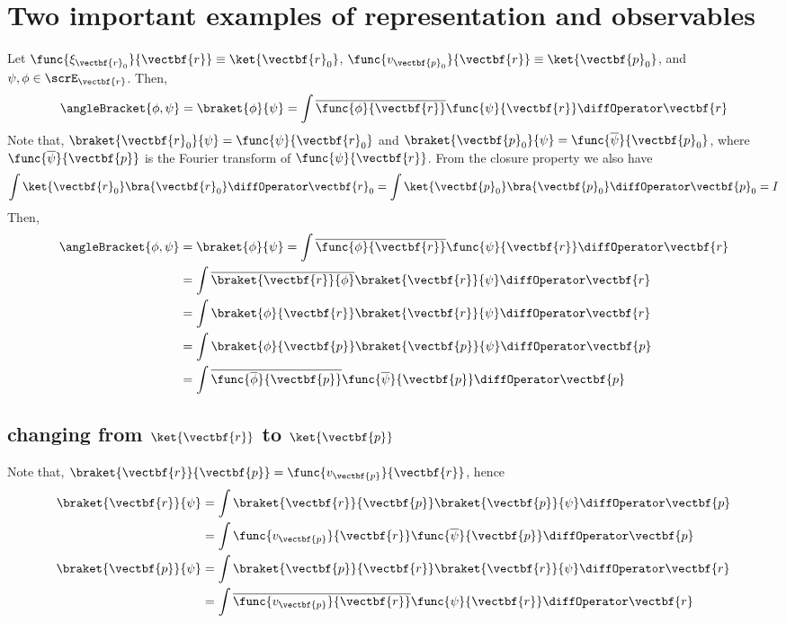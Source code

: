 \section{Two important examples of representation and observables}
Let \(\func{\xi_{\vectbf{r}_0}}{\vectbf{r}} \equiv \ket{\vectbf{r}_0}\), \(\func{v_{\vectbf{p}_0}}{\vectbf{r}} \equiv \ket{\vectbf{p}_0}\), and \(\psi, \phi \in \scrE_{\vectbf{r}}\). Then,
\begin{equation*}
    \angleBracket{\phi,\psi} = \braket{\phi}{\psi} = \int \overline{\func{\phi}{\vectbf{r}}} \func{\psi}{\vectbf{r}} \diffOperator \vectbf{r}
\end{equation*}
Note that, \(\braket{\vectbf{r}_0}{\psi} = \func{\psi}{\vectbf{r}_0}\) and \(\braket{\vectbf{p}_0}{\psi} = \func{\overline{\psi}}{\vectbf{p}_0}\), where \(\func{\overline{\psi}}{\vectbf{p}}\) is the Fourier transform of \(\func{\psi}{\vectbf{r}}\). From the closure property we also have
\begin{equation*}
    \int \ket{\vectbf{r}_0} \bra{\vectbf{r}_0} \diffOperator \vectbf{r}_0 = \int \ket{\vectbf{p}_0} \bra{\vectbf{p}_0} \diffOperator \vectbf{p}_0 = I
\end{equation*}
Then,
\begin{align*}
    \angleBracket{\phi,\psi} & = \braket{\phi}{\psi} = \int \overline{\func{\phi}{\vectbf{r}}} \func{\psi}{\vectbf{r}} \diffOperator \vectbf{r} \\
                             & = \int \overline{\braket{\vectbf{r}}{\phi}} \braket{\vectbf{r}}{\psi} \diffOperator \vectbf{r}                   \\
                             & = \int \braket{\phi}{\vectbf{r}} \braket{\vectbf{r}}{\psi} \diffOperator \vectbf{r}                              \\
                             & = \int \braket{\phi}{\vectbf{p}} \braket{\vectbf{p}}{\psi} \diffOperator \vectbf{p}                              \\
                             & = \int \overline{\func{\overline{\phi}}{\vectbf{p}}} \func{\overline{\psi}}{\vectbf{p}} \diffOperator \vectbf{p}
\end{align*}
\subsection{changing from \(\ket{\vectbf{r}}\) to \(\ket{\vectbf{p}}\)}
Note that, \(\braket{\vectbf{r}}{\vectbf{p}} = \func{v_{\vectbf{p}}}{\vectbf{r}}\), hence
\begin{align*}
    \braket{\vectbf{r}}{\psi} & = \int \braket{\vectbf{r}}{\vectbf{p}} \braket{\vectbf{p}}{\psi} \diffOperator \vectbf{p}            \\
                              & = \int \func{v_{\vectbf{p}}}{\vectbf{r}} \func{\overline{\psi}}{\vectbf{p}} \diffOperator \vectbf{p} \\
    \braket{\vectbf{p}}{\psi} & = \int \braket{\vectbf{p}}{\vectbf{r}} \braket{\vectbf{r}}{\psi} \diffOperator \vectbf{r}            \\
                              & = \int \overline{\func{v_{\vectbf{p}}}{\vectbf{r}}} \func{\psi}{\vectbf{r}} \diffOperator \vectbf{r}
\end{align*}
